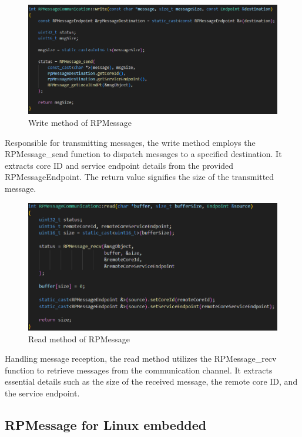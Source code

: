 \begin{figure}[H]
    \centering
    \includegraphics[width=1.0\textwidth]{Figures/implementation_rpmessage_write.png}
    \caption{Write method of RPMessage}
\end{figure}

Responsible for transmitting messages, the write method employs the RPMessage\_send
function to dispatch messages to a specified destination.
It extracts core ID and service endpoint details from the provided
RPMessageEndpoint. The return value signifies the size of the transmitted
message.

\begin{figure}[H]
    \centering
    \includegraphics[width=1.0\textwidth]{Figures/implementation_rpmessage_read.png}
    \caption{Read method of RPMessage}
\end{figure}

Handling message reception, the read method utilizes the RPMessage\_recv
function to retrieve messages from the communication channel.
It extracts essential details such as the size of the received message,
the remote core ID, and the service endpoint.

\subsection{RPMessage for Linux embedded}

